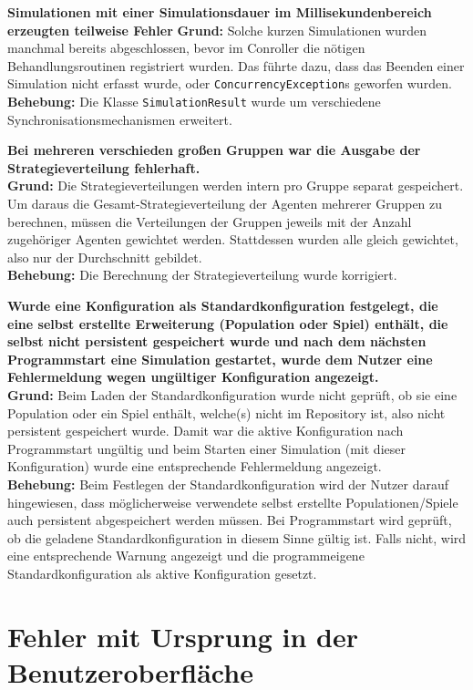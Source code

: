 \documentclass[parskip=full,11pt,openany]{scrreprt}
\begin{document}
\textbf{Simulationen mit einer Simulationsdauer im Millisekundenbereich erzeugten teilweise Fehler} 
\newline
\textbf{Grund: } Solche kurzen Simulationen wurden manchmal bereits abgeschlossen, bevor im Conroller die nötigen Behandlungsroutinen registriert wurden. Das führte dazu, dass das Beenden einer Simulation nicht erfasst wurde, oder  \texttt{ConcurrencyException}s geworfen wurden.
\newline
\textbf{Behebung: } Die Klasse \texttt{SimulationResult} wurde um verschiedene Synchronisationsmechanismen erweitert.

\textbf{Bei mehreren verschieden großen Gruppen war die Ausgabe der Strategieverteilung fehlerhaft.}\\
\textbf{Grund: } Die Strategieverteilungen werden intern pro Gruppe separat gespeichert. Um daraus die Gesamt-Strategieverteilung der Agenten mehrerer Gruppen zu berechnen, müssen die Verteilungen der Gruppen jeweils mit der Anzahl zugehöriger Agenten gewichtet werden. Stattdessen wurden alle gleich gewichtet, also nur der Durchschnitt gebildet.\\
\textbf{Behebung: } Die Berechnung der Strategieverteilung wurde korrigiert.

\textbf{Wurde eine Konfiguration als Standardkonfiguration festgelegt, die eine selbst erstellte Erweiterung (Population oder Spiel) enthält, die selbst nicht persistent gespeichert wurde und nach dem nächsten Programmstart eine Simulation gestartet, wurde dem Nutzer eine Fehlermeldung wegen ungültiger Konfiguration angezeigt.}\\
\textbf{Grund: } Beim Laden der Standardkonfiguration wurde nicht geprüft, ob sie eine Population oder ein Spiel enthält, welche(s) nicht im Repository ist, also nicht persistent gespeichert wurde. Damit war die aktive Konfiguration nach Programmstart ungültig und beim Starten einer Simulation (mit dieser Konfiguration) wurde eine entsprechende Fehlermeldung angezeigt.\\
\textbf{Behebung: } Beim Festlegen der Standardkonfiguration wird der Nutzer darauf hingewiesen, dass möglicherweise verwendete selbst erstellte Populationen/Spiele auch persistent abgespeichert werden müssen. Bei Programmstart wird geprüft, ob die geladene Standardkonfiguration in diesem Sinne gültig ist. Falls nicht, wird eine entsprechende Warnung angezeigt und die programmeigene Standardkonfiguration als aktive Konfiguration gesetzt.

\section{Fehler mit Ursprung in der Benutzeroberfläche}
\end{document}
